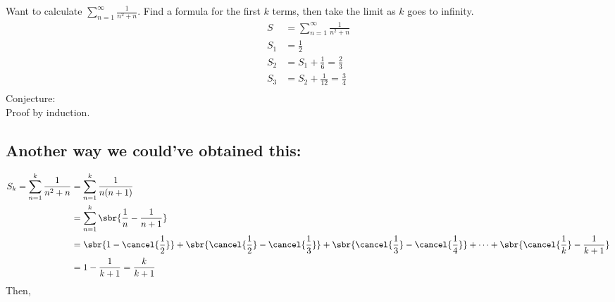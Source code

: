 \documentclass[../13.tex]{subfiles}
\begin{document}
Want to calculate \(\sum_{n = 1}^{\infty} \frac{1}{n^2+n}\). Find a formula for the first \(k\) terms, then take the limit as \(k\) goes to infinity. \begin{align*}
    S   & = \sum_{n = 1}^{\infty} \frac{1}{n^2+n} \\
    S_1 & = \frac{1}{2}                           \\
    S_2 & = S_1 + \frac{1}{6} = \frac{2}{3}       \\
    S_3 & = S_2 + \frac{1}{12} = \frac{3}{4}      \\
\end{align*}
Conjecture:  \\
Proof by induction.
\subsection*{Another way we could've obtained this:}
\begin{align*}
    S_k = \sum_{n = 1}^{k} \frac{1}{n^2+n} & = \sum_{n = 1}^{k} \frac{1}{n(n+1)}                                                                                                                                                             \\
                                           & = \sum_{n = 1}^{k} \sbr{\frac{1}{n} - \frac{1}{n+1}}                                                                                                                                            \\
                                           & = \sbr{1 - \cancel{\frac{1}{2}}} + \sbr{\cancel{\frac{1}{2}} - \cancel{\frac{1}{3}}} + \sbr{\cancel{\frac{1}{3}} - \cancel{\frac{1}{4}}} + \dots + \sbr{\cancel{\frac{1}{k}} - \frac{1}{k + 1}} \\
                                           & = 1 - \frac{1}{k+1} = \frac{k}{k+1}
\end{align*}
Then, 

\newpage
\end{document}
